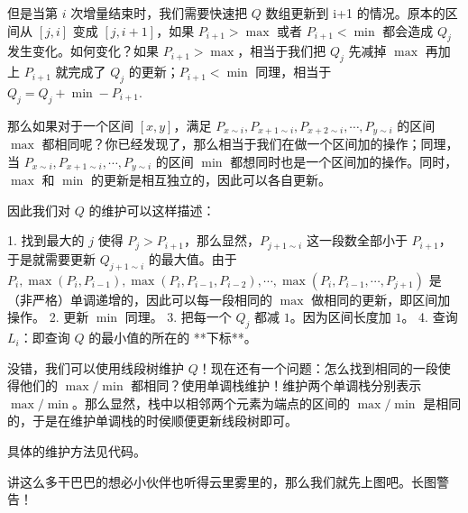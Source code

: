 \documentclass[12pt]{ctexart}
\begin{document}
但是当第 $i$ 次增量结束时，我们需要快速把 $Q$ 数组更新到 i+1 的情况。原本的区间从 $[j,i]$ 变成 $[j,i+1]$，如果 $P_{i+1}>\max$ 或者 $P_{i+1}<\min$ 都会造成 $Q_j$ 发生变化。如何变化？如果 $P_{i+1}>\max$，相当于我们把 $Q_j$ 先减掉 $\max$ 再加上 $P_{i+1}$ 就完成了 $Q_j$ 的更新；$P_{i+1}<\min$ 同理，相当于 $Q_j=Q_j+\min-P_{i+1}$.

那么如果对于一个区间 $[x,y]$，满足 $P_{x\sim i},P_{x+1\sim i},P_{x+2\sim i},\cdots,P_{y\sim i}$ 的区间 $\max$ 都相同呢？你已经发现了，那么相当于我们在做一个区间加的操作；同理，当 $P_{x\sim i},P_{x+1\sim i},\cdots,P_{y\sim i}$ 的区间 $\min$ 都想同时也是一个区间加的操作。同时，$\max$ 和 $\min$ 的更新是相互独立的，因此可以各自更新。

因此我们对 $Q$ 的维护可以这样描述：

1. 找到最大的 $j$ 使得 $P_{j}>P_{i+1}$，那么显然，$P_{j+1\sim i}$ 这一段数全部小于 $P_{i+1}$，于是就需要更新 $Q_{j+1\sim i}$ 的最大值。由于 $P_{i},\max(P_i,P_{i-1}),\max(P_i,P_{i-1},P_{i-2}),\cdots,\max(P_i,P_{i-1},\cdots,P_{j+1})$ 是（非严格）单调递增的，因此可以每一段相同的 $\max$ 做相同的更新，即区间加操作。
2. 更新 $\min$ 同理。
3. 把每一个 $Q_j$ 都减 $1$。因为区间长度加 $1$。
4. 查询 $L_i$：即查询 $Q$ 的最小值的所在的 **下标**。

没错，我们可以使用线段树维护 $Q$！现在还有一个问题：怎么找到相同的一段使得他们的 $\max/\min$ 都相同？使用单调栈维护！维护两个单调栈分别表示 $\max/\min$。那么显然，栈中以相邻两个元素为端点的区间的 $\max/\min$ 是相同的，于是在维护单调栈的时侯顺便更新线段树即可。

具体的维护方法见代码。

讲这么多干巴巴的想必小伙伴也听得云里雾里的，那么我们就先上图吧。长图警告！
\end{document}

